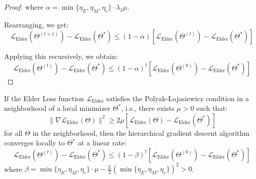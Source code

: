 \begin{proof}
where $\alpha = \min\{\eta_E, \eta_M, \eta_e\} \cdot \lambda_3 \mu$.

Rearranging, we get:
\begin{equation}
\mathcal{L}_{\text{Elder}}(\Theta^{(t+1)}) - \mathcal{L}_{\text{Elder}}(\Theta^*) \leq (1 - \alpha)[\mathcal{L}_{\text{Elder}}(\Theta^{(t)}) - \mathcal{L}_{\text{Elder}}(\Theta^*)]
\end{equation}

Applying this recursively, we obtain:
\begin{equation}
\mathcal{L}_{\text{Elder}}(\Theta^{(t)}) - \mathcal{L}_{\text{Elder}}(\Theta^*) \leq (1 - \alpha)^t [\mathcal{L}_{\text{Elder}}(\Theta^{(0)}) - \mathcal{L}_{\text{Elder}}(\Theta^*)]
\end{equation}
\end{proof}

\begin{theorem}
If the Elder Loss function $\mathcal{L}_{\text{Elder}}$ satisfies the Polyak-Łojasiewicz condition in a neighborhood of a local minimizer $\Theta^*$, i.e., there exists $\mu > 0$ such that:
\begin{equation}
\|\nabla \mathcal{L}_{\text{Elder}}(\Theta)\|^2 \geq 2\mu[\mathcal{L}_{\text{Elder}}(\Theta) - \mathcal{L}_{\text{Elder}}(\Theta^*)]
\end{equation}
for all $\Theta$ in the neighborhood, then the hierarchical gradient descent algorithm converges locally to $\Theta^*$ at a linear rate:
\begin{equation}
\mathcal{L}_{\text{Elder}}(\Theta^{(t)}) - \mathcal{L}_{\text{Elder}}(\Theta^*) \leq (1 - \beta)^t [\mathcal{L}_{\text{Elder}}(\Theta^{(0)}) - \mathcal{L}_{\text{Elder}}(\Theta^*)]
\end{equation}
where $\beta = \min\{\eta_E, \eta_M, \eta_e\} \cdot \mu - \frac{L}{2}(\min\{\eta_E, \eta_M, \eta_e\})^2 > 0$.
\end{theorem}

